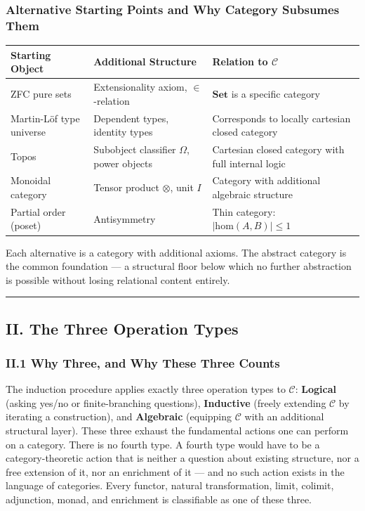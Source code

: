 \documentclass[12pt,a4paper]{article}
\begin{document}
\subsubsection{Alternative Starting Points and Why Category Subsumes Them}
\begin{table}[htbp]
\centering
\small
{}
\begin{tabularx}{\textwidth}{>{\centering\arraybackslash}X >{\centering\arraybackslash}X >{\centering\arraybackslash}X}
\toprule
\rowcolor{gray!25}\textbf{Starting Object} & \textbf{Additional Structure} & \textbf{Relation to $\mathcal{C}$} \\
\midrule
\rowcolors{1}{white}{gray!10}
ZFC pure sets & Extensionality axiom, $\in$-relation & $\mathbf{Set}$ is a specific category \\
Martin-L\"of type universe & Dependent types, identity types & Corresponds to locally cartesian closed category \\
Topos & Subobject classifier $\Omega$, power objects & Cartesian closed category with full internal logic \\
Monoidal category & Tensor product $\otimes$, unit $I$ & Category with additional algebraic structure \\
Partial order (poset) & Antisymmetry & Thin category: $|\text{hom}(A,B)| \leq 1$ \\
\bottomrule
\end{tabularx}
\end{table}
Each alternative is a category with additional axioms. The abstract category is the common foundation --- a structural floor below which no further abstraction is possible without losing relational content entirely.

\begin{center}
\rule{0.5\textwidth}{0.4pt}
\end{center}

\subsection{II. The Three Operation Types}
\subsubsection{II.1 Why Three, and Why These Three Counts}
The induction procedure applies exactly three operation types to $\mathcal{C}$: \textbf{Logical} (asking yes/no or finite-branching questions), \textbf{Inductive} (freely extending $\mathcal{C}$ by iterating a construction), and \textbf{Algebraic} (equipping $\mathcal{C}$ with an additional structural layer). These three exhaust the fundamental actions one can perform on a category. There is no fourth type. A fourth type would have to be a category-theoretic action that is neither a question about existing structure, nor a free extension of it, nor an enrichment of it --- and no such action exists in the language of categories. Every functor, natural transformation, limit, colimit, adjunction, monad, and enrichment is classifiable as one of these three.
\end{document}
